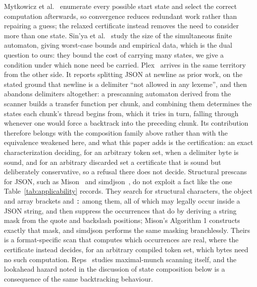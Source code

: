 \documentclass[11pt,a4paper]{article}
\theoremstyle{definition}
\theoremstyle{plain}
\newcommand{\code}[1]{\texttt{#1}}
\begin{document}
Mytkowicz et al.~\cite{mytkowicz2014dpfsm} enumerate every possible start state and select the correct computation
afterwards, so convergence reduces redundant work rather than repairing a guess; the relaxed certificate instead removes
the need to consider more than one state. Sin'ya et al.~\cite{sinya2013sfa} study the size of the simultaneous finite
automaton, giving worst-case bounds and empirical data, which is the dual question to ours: they bound the cost of
carrying many states, we give a condition under which none need be carried. Plex~\cite{li2021plex} arrives in the same
territory from the other side. It reports splitting JSON at newline as prior work, on the stated ground that newline is
a delimiter ``not allowed in any lexeme'', and then abandons delimiters altogether: a prescanning automaton derived from
the scanner builds a transfer function per chunk, and combining them determines the states each chunk's thread begins
from, which it tries in turn, falling through whenever one would force a backtrack into the preceding chunk. Its
contribution therefore belongs with the composition family above rather than with the equivalence weakened here, and
what this paper adds is the certification: an exact characterization deciding, for an arbitrary token set, when a
delimiter byte is sound, and for an arbitrary discarded set a certificate that is sound but deliberately conservative,
so a refusal there does not decide. Structural prescans for JSON, such as Mison~\cite{li2017mison} and
simdjson~\cite{langdale2019simdjson}, do not exploit a fact like the one Table~\ref{tab:applicability} records. They
search for structural characters, the object and array brackets and \code{:} among them, all of which may legally occur
inside a JSON string, and then suppress the occurrences that do by deriving a string mask from the quote and backslash
positions; Mison's Algorithm 1 constructs exactly that mask, and simdjson performs the same masking branchlessly. Theirs
is a format-specific scan that computes which occurrences are real, where the certificate instead decides, for an
arbitrary compiled token set, which bytes need no such computation. Reps~\cite{reps1998maximal} studies maximal-munch
scanning itself, and the lookahead hazard noted in the discussion of state composition below is a consequence of the
same backtracking behaviour.
\end{document}
